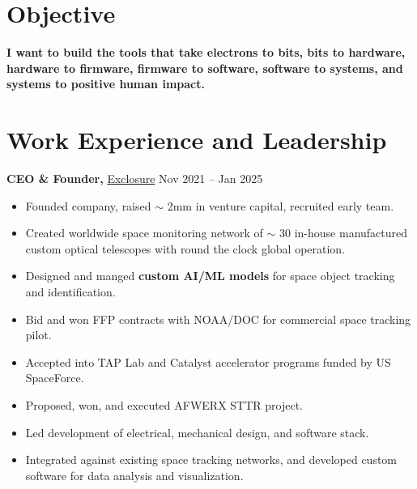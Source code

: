 \documentclass{res}
\begin{document}
\begin{resume}

\section{Objective}
\textbf{I want to build the tools that take electrons to bits, bits to hardware, hardware to firmware, 
firmware to software, software to systems, and systems to positive human impact.}

\section{Work Experience and Leadership}

{\bf CEO \& Founder,} \href{http://www.exclosure.io}{Exclosure} \hfill
Nov 2021 -- Jan 2025
\begin{itemize}  \itemsep -2pt
  \item Founded company, raised $\sim$ 2mm in venture capital, recruited early team.
  \item Created worldwide space monitoring network of $\sim$ 30
        in-house manufactured custom optical telescopes with round the clock global operation.
  \item Designed and manged \textbf{custom AI/ML models} for space object tracking and identification.
  \item Bid and won FFP contracts with NOAA/DOC for commercial space tracking pilot.
  \item Accepted into TAP Lab and Catalyst accelerator programs funded by US SpaceForce.
  \item Proposed, won, and executed AFWERX STTR project.
  \item Led development of electrical, mechanical design, and software stack.
  \item Integrated against existing space tracking networks, and developed custom
        software for data analysis and visualization.
\end{itemize}


\end{resume}
\end{document}
